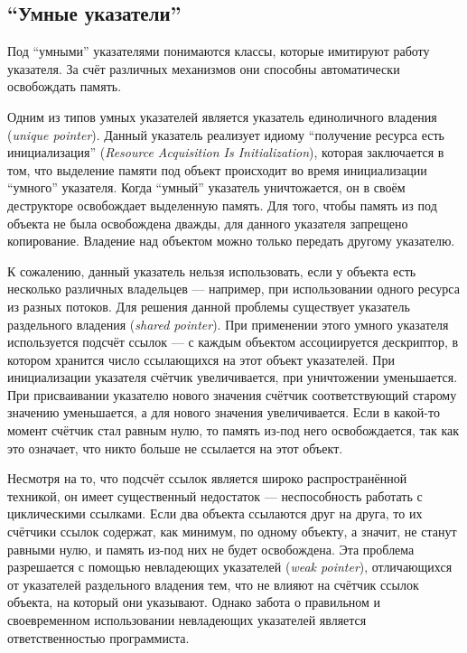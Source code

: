 \documentclass[14pt]{matmex-diploma}
\begin{document}
\subsection{``Умные указатели''}
Под ``умными'' указателями понимаются классы, которые имитируют работу указателя. За счёт различных механизмов они способны автоматически освобождать память.

Одним из типов умных указателей является указатель единоличного владения (\textit{unique pointer}). Данный указатель реализует идиому ``получение ресурса есть инициализация'' (\textit{Resource Acquisition Is Initialization}), которая заключается в том, что выделение памяти под объект происходит во время инициализации ``умного'' указателя. Когда ``умный'' указатель уничтожается, он в своём деструкторе освобождает выделенную память. Для того, чтобы память из под объекта не была освобождена дважды, для данного указателя запрещено копирование. Владение над объектом можно только передать другому указателю.

К сожалению, данный указатель нельзя использовать, если у объекта есть несколько различных владельцев --- например, при использовании одного ресурса из разных потоков. Для решения данной проблемы существует указатель раздельного владения (\textit{shared pointer}). 
При применении этого умного указателя используется подсчёт ссылок --- с каждым объектом ассоциируется дескриптор, в котором хранится число ссылающихся на этот объект указателей. При инициализации указателя счётчик увеличивается, при уничтожении уменьшается. При присваивании указателю нового значения счётчик соответствующий старому значению уменьшается, а для нового значения увеличивается. Если в какой-то момент счётчик стал равным нулю, то память из-под него освобождается, так как это означает, что никто больше не ссылается на этот объект.

Несмотря на то, что подсчёт ссылок является широко распространённой техникой, он имеет существенный недостаток --- неспособность работать с циклическими ссылками. Если два объекта ссылаются друг на друга, то их счётчики ссылок содержат, как минимум, по одному объекту, а значит, не станут равными нулю, и память из-под них не будет освобождена. Эта проблема разрешается с помощью невладеющих указателей (\textit{weak pointer}), отличающихся от указателей раздельного владения тем, что не влияют на счётчик ссылок объекта, на который  они указывают. Однако забота о правильном и своевременном использовании невладеющих указателей является ответственностью программиста.
\end{document}
